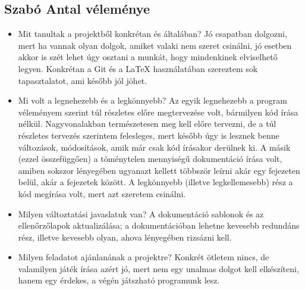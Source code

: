 \subsection{Szabó Antal véleménye}
\begin{itemize}

\item Mit tanultak a projektből konkrétan és általában? \newline
Jó csapatban dolgozni, mert ha vannak olyan dolgok, amiket valaki nem szeret csinálni, jó esetben akkor is szét lehet úgy osztani a munkát, hogy mindenkinek elviselhető legyen. \newline
Konkrétan a Git és a \LaTeX{} használatában szereztem sok tapasztalatot, ami később jól jöhet.

\item Mi volt a legnehezebb és a legkönnyebb? \newline
Az egyik legnehezebb a program véleményem szerint túl részletes előre megtervezése volt, bármilyen kód írása nélkül. Nagyvonalakban természetesen meg kell előre tervezni, de a túl részletes tervezés szerintem felesleges, mert később úgy is lesznek benne változások, módosítások, amik már csak kód írásakor derülnek ki. A másik (ezzel összefüggően) a töménytelen mennyiségű dokumentáció írása volt, amiben sokszor lényegében ugyanazt kellett többször leírni akár egy fejezeten belül, akár a fejezetek között. \newline
A legkönnyebb (illetve legkellemesebb) rész a kód megírása volt, mert azt szeretem csinálni.

\item Milyen változtatási javaslatuk van? \newline
A dokumentáció sablonok és az ellenőrzőlapok aktualizálása; a dokumentációban lehetne kevesebb redundáns rész, illetve kevesebb olyan, ahova lényegében rizsázni kell.

\item Milyen feladatot ajánlanának a projektre? \newline
Konkrét ötletem nincs, de valamilyen játék írása azért jó, mert nem egy unalmas dolgot kell elkészíteni, hanem egy érdekes, a végén játszható programunk lesz.

\end{itemize}
